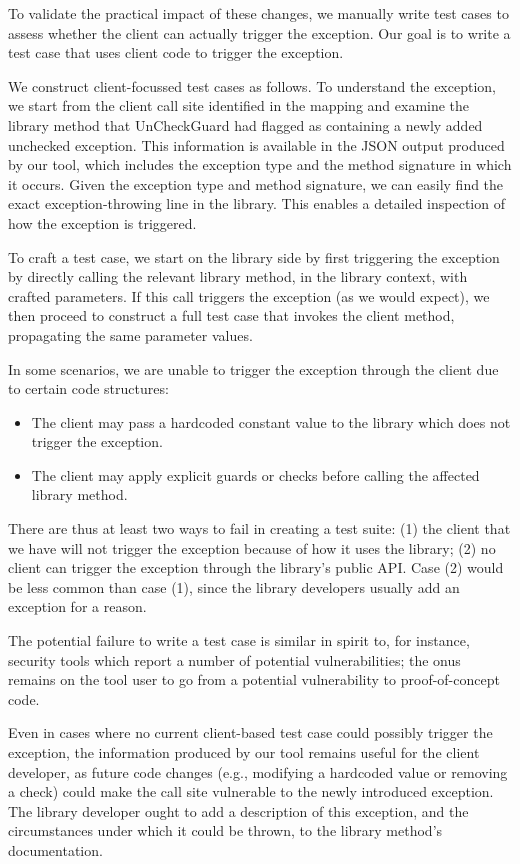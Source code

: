 To validate the practical impact of these changes, we manually write test cases to assess whether the client can actually trigger the exception. Our goal is to write a test case that uses client code to trigger the exception.

We construct client-focussed test cases as follows. To understand the exception, we start from the client call site identified in the mapping and examine the library method that UnCheckGuard had flagged as containing a newly added unchecked exception. This information is available in the JSON output produced by our tool, which includes the exception type and the method signature in which it occurs. Given the exception type and method signature, we can easily find the exact exception-throwing line in the library. This enables a detailed inspection of how the exception is triggered.

To craft a test case, we start on the library side by first triggering the exception by directly calling the relevant library method, in the library context, with crafted parameters. If this call triggers the exception (as we would expect), we then proceed to construct a full test case that invokes the client method, propagating the same parameter values.

In some scenarios, we are unable to trigger the exception through the client due to certain code structures:
\begin{itemize}
  \item The client may pass a hardcoded constant value to the library which does not trigger the exception.
  \item The client may apply explicit guards or checks before calling the affected library method.
\end{itemize}
There are thus at least two ways to fail in creating a test suite: (1) the client that we have will not trigger the exception because of how it uses the library; (2) no client can trigger the exception through the library's public API. Case (2) would be less common than case (1), since the library developers usually add an exception for a reason.

The potential failure to write a test case is similar in spirit to, for instance, security tools which report a number of potential vulnerabilities; the onus remains on the tool user to go from a potential vulnerability to proof-of-concept code.

Even in cases where no current client-based test case could possibly trigger the exception, the information produced by our tool remains useful for the client developer, as future code changes (e.g., modifying a hardcoded value or removing a check) could make the call site vulnerable to the newly introduced exception. The library developer ought to add a description of this exception, and the circumstances under which it could be thrown, to the library method's documentation.

